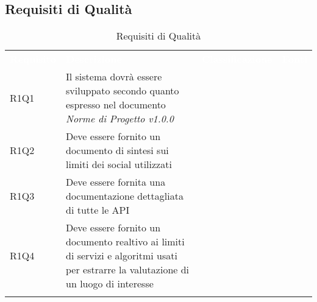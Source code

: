 \subsection{Requisiti di Qualità}


\renewcommand{\arraystretch}{1.5}
\begin{longtable}{ m{}<{\centering}  m{}<{\centering}  m{}<{\centering}  m{}<{\centering}}
	\rowcolor{darkblue}
	\textcolor{white}{\textbf{Requisito}} &\textcolor{white}{\textbf{Descrizione}}& \textcolor{white}{\textbf{Classificazione}} & \textcolor{white}{\textbf{Fonti}}\\ 

	R1Q1 & Il sistema dovrà essere sviluppato secondo quanto espresso nel documento \textit{Norme di Progetto v1.0.0} & \Ob & \Di \\
	
	R1Q2 & Deve essere fornito un documento di sintesi sui limiti dei social utilizzati & \Ob & \Ca \\
	
	R1Q3 & Deve essere fornita una documentazione dettagliata di tutte le API & \Ob & \Ca \\

	R1Q4 & Deve essere fornito un documento realtivo ai limiti di servizi e algoritmi usati per estrarre la valutazione di un luogo di interesse & \Ob & \Ca \\

	\hiderowcolors \caption{Requisiti di Qualità}
\end{longtable}

\clearpage